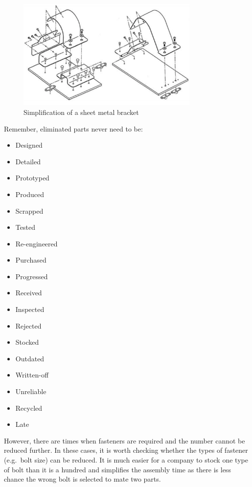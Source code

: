 \begin{figure}[t!]
  \centering
  \includegraphics[width=0.8\textwidth]{figs/simplification.png}
  \caption{Simplification of a sheet metal bracket}\label{fig-bracket}
\end{figure}


Remember, eliminated parts never need to be:

\begin{multicols}{3}
  \begin{itemize}
    \item Designed
    \item Detailed
    \item Prototyped
    \item Produced
    \item Scrapped
    \item Tested
    \item Re-engineered
    \item Purchased
    \item Progressed
    \item Received
    \item Inspected
    \item Rejected
    \item Stocked
    \item Outdated
    \item Written-off
    \item Unreliable
    \item Recycled
    \item Late
  \end{itemize}
\end{multicols}

However, there are times when fasteners are required and the number cannot be reduced further. In these cases, it is worth checking whether the types of fastener (e.g.\ bolt size) can be reduced. It is much easier for a company to stock one type of bolt than it is a hundred and simplifies the assembly time as there is less chance the wrong bolt is selected to mate two parts.

